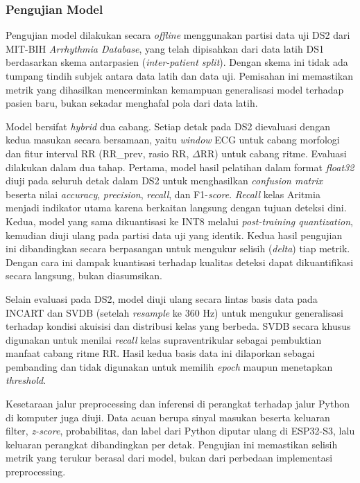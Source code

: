 \subsubsection{Pengujian Model}

Pengujian model dilakukan secara \textit{offline} menggunakan partisi data uji DS2 dari MIT-BIH \textit{Arrhythmia Database}, yang telah dipisahkan dari data latih DS1 berdasarkan skema antarpasien (\textit{inter-patient split}). Dengan skema ini tidak ada tumpang tindih subjek antara data latih dan data uji. Pemisahan ini memastikan metrik yang dihasilkan mencerminkan kemampuan generalisasi model terhadap pasien baru, bukan sekadar menghafal pola dari data latih.

Model bersifat \textit{hybrid} dua cabang. Setiap detak pada DS2 dievaluasi dengan kedua masukan secara bersamaan, yaitu \textit{window} ECG untuk cabang morfologi dan fitur interval RR (RR\_prev, rasio RR, $\Delta$RR) untuk cabang ritme. Evaluasi dilakukan dalam dua tahap. Pertama, model hasil pelatihan dalam format \textit{float32} diuji pada seluruh detak dalam DS2 untuk menghasilkan \textit{confusion matrix} beserta nilai \textit{accuracy}, \textit{precision}, \textit{recall}, dan F1-\textit{score}. \textit{Recall} kelas Aritmia menjadi indikator utama karena berkaitan langsung dengan tujuan deteksi dini. Kedua, model yang sama dikuantisasi ke INT8 melalui \textit{post-training quantization}, kemudian diuji ulang pada partisi data uji yang identik. Kedua hasil pengujian ini dibandingkan secara berpasangan untuk mengukur selisih (\textit{delta}) tiap metrik. Dengan cara ini dampak kuantisasi terhadap kualitas deteksi dapat dikuantifikasi secara langsung, bukan diasumsikan.

Selain evaluasi pada DS2, model diuji ulang secara lintas basis data pada INCART dan
SVDB (setelah \emph{resample} ke 360 Hz) untuk mengukur generalisasi terhadap kondisi
akuisisi dan distribusi kelas yang berbeda. SVDB secara khusus digunakan untuk menilai
\emph{recall} kelas supraventrikular sebagai pembuktian manfaat cabang ritme RR. Hasil
kedua basis data ini dilaporkan sebagai pembanding dan tidak digunakan untuk memilih
\textit{epoch} maupun menetapkan \textit{threshold}.

Kesetaraan jalur preprocessing dan inferensi di perangkat terhadap jalur Python di komputer juga diuji. Data acuan berupa sinyal masukan beserta keluaran filter, \textit{z-score}, probabilitas, dan label dari Python diputar ulang di ESP32-S3, lalu keluaran perangkat dibandingkan per detak. Pengujian ini memastikan selisih metrik yang terukur berasal dari model, bukan dari perbedaan implementasi preprocessing.

